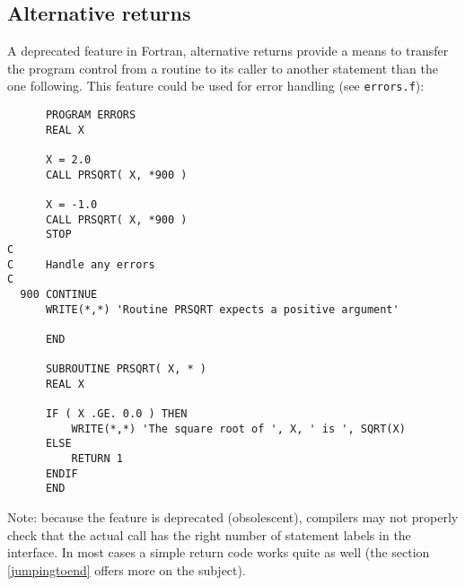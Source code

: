 \subsection{Alternative returns}
A deprecated feature in Fortran, alternative returns provide a means to
transfer the program control from a routine to its caller to another
statement than the one following. This feature could be used for
error handling (see \verb+errors.f+):
\begin{verbatim}
      PROGRAM ERRORS
      REAL X

      X = 2.0
      CALL PRSQRT( X, *900 )

      X = -1.0
      CALL PRSQRT( X, *900 )
      STOP
C
C     Handle any errors
C
  900 CONTINUE
      WRITE(*,*) 'Routine PRSQRT expects a positive argument'

      END

      SUBROUTINE PRSQRT( X, * )
      REAL X

      IF ( X .GE. 0.0 ) THEN
          WRITE(*,*) 'The square root of ', X, ' is ', SQRT(X)
      ELSE
          RETURN 1
      ENDIF
      END
\end{verbatim}

Note: because the feature is deprecated (obsolescent), compilers may not properly check that
the actual call has the right number of statement labels in the interface. In most cases
a simple return code works quite as well (the section \ref{jumpingtoend} offers more
on the subject).

